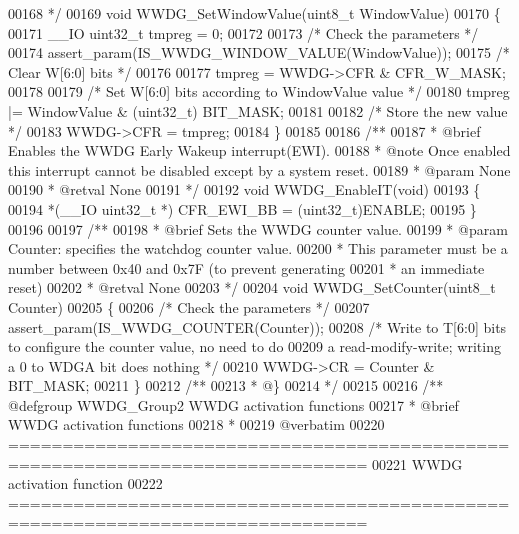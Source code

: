 \begin{DoxyCode}
00168 \textcolor{comment}{  */}
00169 \textcolor{keywordtype}{void} WWDG_SetWindowValue(uint8\_t WindowValue)
00170 \{
00171   \_\_IO uint32\_t tmpreg = 0;
00172 
00173   \textcolor{comment}{/* Check the parameters */}
00174   assert_param(IS\_WWDG\_WINDOW\_VALUE(WindowValue));
00175   \textcolor{comment}{/* Clear W[6:0] bits */}
00176 
00177   tmpreg = WWDG->CFR & CFR_W_MASK;
00178 
00179   \textcolor{comment}{/* Set W[6:0] bits according to WindowValue value */}
00180   tmpreg |= WindowValue & (uint32\_t) BIT_MASK;
00181 
00182   \textcolor{comment}{/* Store the new value */}
00183   WWDG->CFR = tmpreg;
00184 \}
00185 
00186 \textcolor{comment}{/**}
00187 \textcolor{comment}{  * @brief  Enables the WWDG Early Wakeup interrupt(EWI).}
00188 \textcolor{comment}{  * @note   Once enabled this interrupt cannot be disabled except by a system reset.}
00189 \textcolor{comment}{  * @param  None}
00190 \textcolor{comment}{  * @retval None}
00191 \textcolor{comment}{  */}
00192 \textcolor{keywordtype}{void} WWDG_EnableIT(\textcolor{keywordtype}{void})
00193 \{
00194   *(\_\_IO uint32\_t *) CFR_EWI_BB = (uint32\_t)ENABLE;
00195 \}
00196 
00197 \textcolor{comment}{/**}
00198 \textcolor{comment}{  * @brief  Sets the WWDG counter value.}
00199 \textcolor{comment}{  * @param  Counter: specifies the watchdog counter value.}
00200 \textcolor{comment}{  *   This parameter must be a number between 0x40 and 0x7F (to prevent generating}
00201 \textcolor{comment}{  *   an immediate reset) }
00202 \textcolor{comment}{  * @retval None}
00203 \textcolor{comment}{  */}
00204 \textcolor{keywordtype}{void} WWDG_SetCounter(uint8\_t Counter)
00205 \{
00206   \textcolor{comment}{/* Check the parameters */}
00207   assert_param(IS\_WWDG\_COUNTER(Counter));
00208   \textcolor{comment}{/* Write to T[6:0] bits to configure the counter value, no need to do}
00209 \textcolor{comment}{     a read-modify-write; writing a 0 to WDGA bit does nothing */}
00210   WWDG->CR = Counter & BIT_MASK;
00211 \}
00212 \textcolor{comment}{/**}
00213 \textcolor{comment}{  * @\}}
00214 \textcolor{comment}{  */}
00215 
00216 \textcolor{comment}{/** @defgroup WWDG\_Group2 WWDG activation functions}
00217 \textcolor{comment}{ *  @brief   WWDG activation functions }
00218 \textcolor{comment}{ *}
00219 \textcolor{comment}{@verbatim   }
00220 \textcolor{comment}{ ===============================================================================}
00221 \textcolor{comment}{                       WWDG activation function}
00222 \textcolor{comment}{ ===============================================================================  }

\end{DoxyCode}

